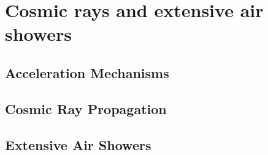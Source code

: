 
\chapter{Cosmic rays and extensive air showers}
\label{chap:cosmic-rays}

\cite{Roulet2015}

\section{Acceleration Mechanisms}

\blindtext

\section{Cosmic Ray Propagation}

\blindtext

\section{Extensive Air Showers}

\blindtext